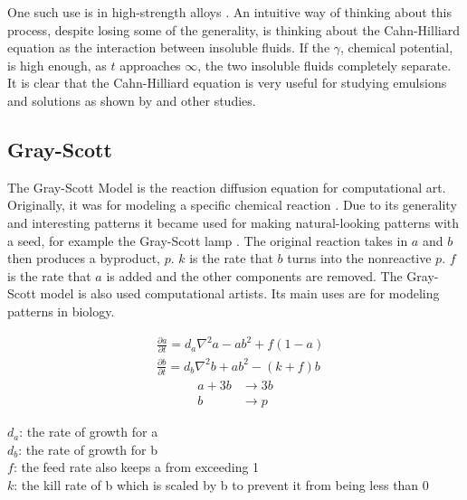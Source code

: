 \documentclass[12pt, letterpaper]{article}
\begin{document}
One such use is in high-strength alloys \citep{challoys}. An intuitive way of thinking about this process,
despite losing some of the generality, is thinking about the Cahn-Hilliard equation as the interaction
between insoluble fluids. If the $\gamma$, chemical potential, is high enough, as $t$ approaches
$\infty$, the two insoluble fluids completely separate. It is clear that the Cahn-Hilliard equation is very
useful for studying emulsions and solutions as shown by \cite{CHEmulsions} and other studies.  

\subsection{Gray-Scott}\label{grayscott}

The Gray-Scott Model is the reaction diffusion equation for computational art. Originally, it was for modeling
a specific chemical reaction \citep{grayscott}. Due to its generality and interesting patterns it
became used for making natural-looking patterns with a seed, for example the Gray-Scott lamp \citep{reactionLamp}. 
The original reaction takes in $a$ and $b$ then produces a byproduct, $p$. $k$ is the rate that $b$ turns
into the nonreactive $p$. $f$ is the rate that $a$ is added and the other components are removed.
The Gray-Scott model is also used computational artists. Its main uses are for modeling patterns in biology.

\begin{singlespace}
  \begin{equation}\label{eq:grayscott}
    \begin{split}
      &\frac{\partial a}{\partial t} = d_a\nabla^2a − ab^2 + f(1−a) \\
      &\frac{\partial b}{\partial t} = d_b\nabla^2b + ab^2 − (k + f)b
    \end{split}
  \end{equation}
  \begin{equation}
    \begin{split}
      a + 3b &\rightarrow 3b \\
           b &\rightarrow p
    \end{split}
  \end{equation}
  \begin{small}
$d_a$: the rate of growth for a \\
$d_b$: the rate of growth for b \\
$f$: the feed rate also keeps a from exceeding 1 \\
$k$: the kill rate of b which is scaled by b to prevent it from being less than 0
  \end{small}
\end{singlespace}
\end{document}
